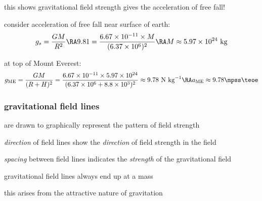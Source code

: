 this shows gravitational field strength gives the acceleration of free fall!


\sol consider acceleration of free fall near surface of earth:
\begin{equation*}
	g_s = \frac{GM}{R^2} \RA 9.81 = \frac{6.67\times10^{-11}\times M}{(6.37\times10^6)^2} \RA M \approx 5.97\times10^{24} \text{ kg}
\end{equation*}

at top of Mount Everest:
\begin{equation*}
g_\text{ME} = \frac{GM}{(R+H)^2} = \frac{6.67\times10^{-11}\times 5.97\times10^{24}}{(6.37\times10^6+8.8\times10^3)^2} \approx 9.78 \text{ N kg}^{-1} \RA a_\text{ME} \approx 9.78 \mpss \teoe
\end{equation*}



\subsubsection{gravitational field lines}
 are drawn to graphically represent the pattern of field strength

\cmt \emph{direction} of field lines show the \emph{direction} of field strength in the field
	
\cmt \emph{spacing} between field lines indicates the \emph{strength} of the gravitational field
	
\cmt gravitational field lines always end up at a mass

     this arises from the attractive nature of gravitation

